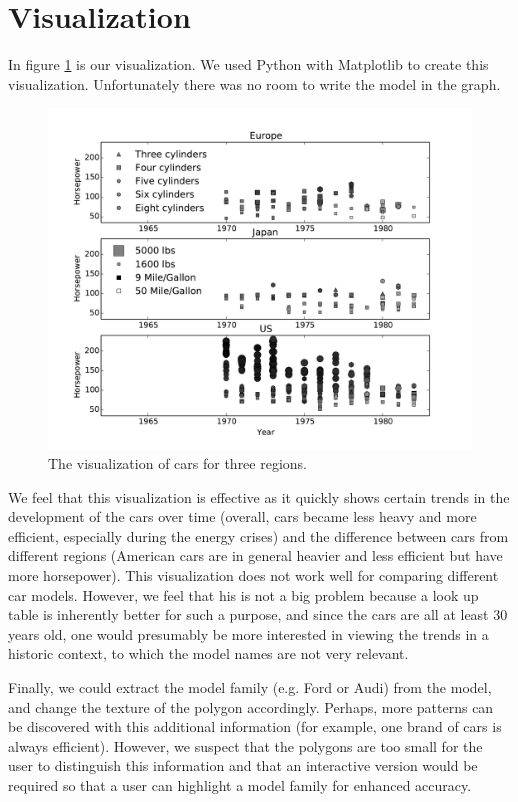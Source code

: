 \documentclass{article}[9pt]
\begin{document}
\section{Visualization}
\vspace{-0.3cm}
In figure \ref{fig:vis} is our visualization. We used Python with Matplotlib to
create this visualization. Unfortunately there was no room to write the model
in the graph.
\vspace{-0.3cm}
\begin{figure}[h!]
\includegraphics[width=\textwidth]{autovis}
\caption{The visualization of cars for three regions.}
\label{fig:vis}
\end{figure}
\vspace{-0.3cm}
We feel that this visualization is effective as it quickly shows certain trends
in the development of the cars over time (overall, cars became less heavy and
more efficient, especially during the energy crises) and the difference between
cars from different regions (American cars are in general heavier and less
efficient but have more horsepower). This visualization does not work well for
comparing different car models. However, we feel that his is not a big problem
because a look up table is inherently better for such a purpose, and since the
cars are all at least 30 years old, one would presumably be more interested in
viewing the trends in a historic context, to which the model names are not very
relevant.

Finally, we could extract the model family (e.g. Ford or Audi) from the model,
and change the texture of the polygon accordingly. Perhaps, more patterns can
be discovered with this additional information (for example, one brand of cars is
always efficient). However, we suspect that the polygons are too small for the
user to distinguish this information and that an interactive version would be
required so that a user can highlight a model family for enhanced accuracy.
\end{document}
